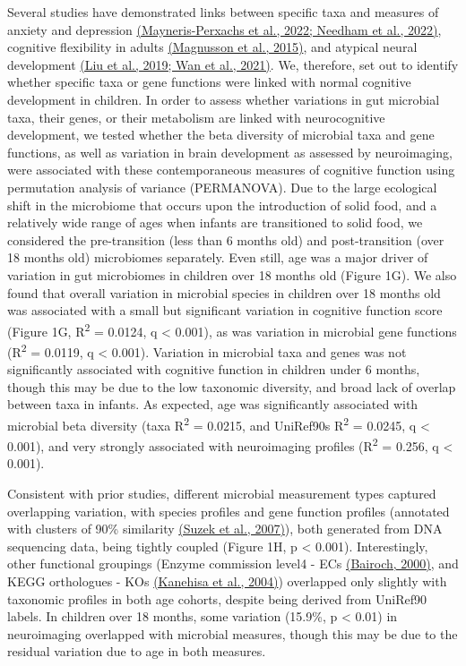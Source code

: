 \documentclass[
]{article}
\begin{document}
Several studies have demonstrated links between specific taxa and
measures of anxiety and depression
\href{https://www.zotero.org/google-docs/?X5rfKj}{(Mayneris-Perxachs et
al., 2022; Needham et al., 2022)}, cognitive flexibility in adults
\href{https://www.zotero.org/google-docs/?RGIf8m}{(Magnusson et al.,
2015)}, and atypical neural development
\href{https://www.zotero.org/google-docs/?hwPZKh}{(Liu et al., 2019; Wan
et al., 2021)}. We, therefore, set out to identify whether specific taxa
or gene functions were linked with normal cognitive development in
children. In order to assess whether variations in gut microbial taxa,
their genes, or their metabolism are linked with neurocognitive
development, we tested whether the beta diversity of microbial taxa and
gene functions, as well as variation in brain development as assessed by
neuroimaging, were associated with these contemporaneous measures of
cognitive function using permutation analysis of variance (PERMANOVA).
Due to the large ecological shift in the microbiome that occurs upon the
introduction of solid food, and a relatively wide range of ages when
infants are transitioned to solid food, we considered the pre-transition
(less than 6 months old) and post-transition (over 18 months old)
microbiomes separately. Even still, age was a major driver of variation
in gut microbiomes in children over 18 months old (Figure 1G). We also
found that overall variation in microbial species in children over 18
months old was associated with a small but significant variation in
cognitive function score (Figure 1G, R\textsuperscript{2} = 0.0124, q
\textless{} 0.001), as was variation in microbial gene functions
(R\textsuperscript{2} = 0.0119, q \textless{} 0.001). Variation in
microbial taxa and genes was not significantly associated with cognitive
function in children under 6 months, though this may be due to the low
taxonomic diversity, and broad lack of overlap between taxa in infants.
As expected, age was significantly associated with microbial beta
diversity (taxa R\textsuperscript{2} = 0.0215, and UniRef90s
R\textsuperscript{2} = 0.0245, q \textless{} 0.001), and very strongly
associated with neuroimaging profiles (R\textsuperscript{2} = 0.256, q
\textless{} 0.001).

Consistent with prior studies, different microbial measurement types
captured overlapping variation, with species profiles and gene function
profiles (annotated with clusters of 90\% similarity
\href{https://www.zotero.org/google-docs/?b9rEJS}{(Suzek et al.,
2007)}), both generated from DNA sequencing data, being tightly coupled
(Figure 1H, p \textless{} 0.001). Interestingly, other functional
groupings (Enzyme commission level4 - ECs
\href{https://www.zotero.org/google-docs/?fs8LO7}{(Bairoch, 2000)}, and
KEGG orthologues - KOs
\href{https://www.zotero.org/google-docs/?Xx5duE}{(Kanehisa et al.,
2004)}) overlapped only slightly with taxonomic profiles in both age
cohorts, despite being derived from UniRef90 labels. In children over 18
months, some variation (15.9\%, p \textless{} 0.01) in neuroimaging
overlapped with microbial measures, though this may be due to the
residual variation due to age in both measures.
\end{document}
